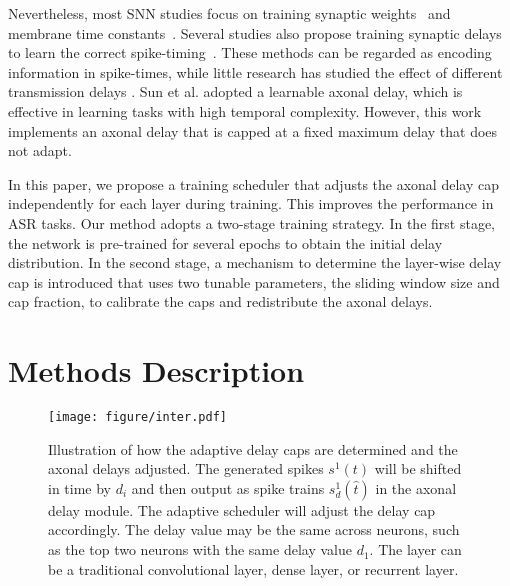 \documentclass{article}
\begin{document}
Nevertheless, most SNN studies focus on training synaptic weights~\cite{shrestha2017robust} and membrane time constants~\cite{perez2021neural, fang2021incorporating}. Several studies also propose training synaptic delays to learn the correct spike-timing~\cite{Shrestha2018,zhang2020supervised}. These methods can be regarded as encoding information in spike-times, while little research has studied the effect of different transmission delays \cite{Shrestha2018}. Sun et al.\cite{Sun2022} adopted a learnable axonal delay, which is effective in learning tasks with high temporal complexity. However, this work implements an axonal delay that is capped at a fixed maximum delay that does not adapt. 

In this paper, we propose a training scheduler that adjusts the axonal delay cap independently for each layer during training. This improves the performance in ASR tasks. Our method adopts a two-stage training strategy. In the first stage, the network is pre-trained for several epochs to obtain the initial delay distribution. In the second stage, a mechanism to determine the layer-wise delay cap is introduced that uses two tunable parameters, the sliding window size and cap fraction, to calibrate the caps and redistribute the axonal delays.

\iffalse
The remainder of this paper is structured as follows. In
Section \ref{2} we describe the spiking neuron model and proposed adaptive training method. The description of our experimental setup is given in Section \ref{3}. In Section \ref{4}, we demonstrate the effectiveness of the proposed method on two event-based audio datasets before concluding in Section \ref{5}.
\fi
\section{Methods Description} \label{2}
\begin{figure*}[htbp]
\centering
\vspace{-0.8cm}
\hspace{-7cm}
\texttt{[image: figure/inter.pdf]}\vspace{-4cm}\hspace{-5cm}
	\caption{Illustration of how the adaptive delay caps are determined and the axonal delays adjusted. The generated spikes $s^1(t)$ will be shifted in time by $d_{i}$ and then output as spike trains $s_{d}^1(\hat t)$ in the axonal delay module. The adaptive scheduler will adjust the delay cap accordingly. The delay value may be the same across neurons, such as the top two neurons with the same delay value $d_{1}$. The layer can be a traditional convolutional layer, dense layer, or recurrent layer.}
\label{fig:input}
\end{figure*}
\end{document}
